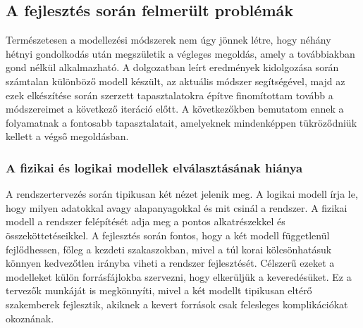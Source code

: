     \subsection{A fejlesztés során felmerült problémák} \label{ProblemsToSolve}
    Természetesen a modellezési módszerek nem úgy jönnek létre, hogy néhány hétnyi gondolkodás után megszületik a végleges megoldás, amely a továbbiakban gond nélkül alkalmazható.
    A dolgozatban leírt eredmények kidolgozása során számtalan különböző modell készült, az aktuális módszer segítségével, majd az ezek elkészítése során szerzett tapasztalatokra építve finomítottam tovább a módszereimet a következő iteráció előtt.
    A következőkben bemutatom ennek a folyamatnak a fontosabb tapasztalatait, amelyeknek mindenképpen tükröződniük kellett a végső megoldásban.

        \subsubsection{A fizikai és logikai modellek elválasztásának hiánya} \label{sec:LogFiz}
        A rendszertervezés során tipikusan két nézet jelenik meg. A logikai modell írja le, hogy milyen adatokkal avagy alapanyagokkal és mit csinál a rendszer.
        A fizikai modell a rendszer felépítését adja meg a pontos alkatrészekkel és összeköttetéseikkel.
        A fejlesztés során fontos, hogy a két modell függetlenül fejlődhessen, főleg a kezdeti szakaszokban, mivel a túl korai kölcsönhatásuk könnyen kedvezőtlen irányba viheti a rendszer fejlesztését.
        Célszerű ezeket a modelleket külön forrásfájlokba szervezni, hogy elkerüljük a keveredésüket.
        Ez a tervezők munkáját is megkönnyíti, mivel a két modellt tipikusan eltérő szakemberek fejlesztik, akiknek a kevert források csak felesleges komplikációkat okoznának.
        
